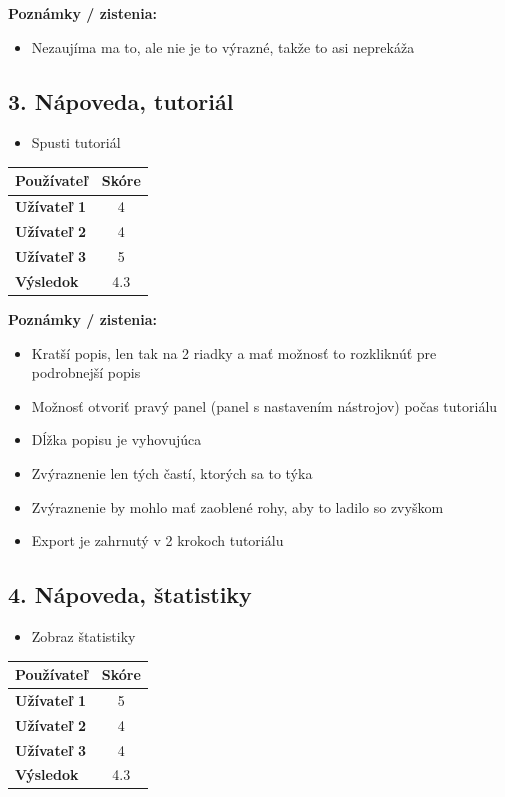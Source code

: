\documentclass[a4paper,12pt]{article}
\begin{document}
\textbf{Poznámky / zistenia:}
\begin{itemize}
    \item Nezaujíma ma to, ale nie je to výrazné, takže to asi neprekáža
\end{itemize}

\subsection*{3. Nápoveda, tutoriál}
\begin{itemize}
    \item Spusti tutoriál
\end{itemize}

\begin{longtable}{>{\bfseries}l c}
\toprule
Používateľ & Skóre \\
\midrule
Užívateľ 1 & 4 \\
Užívateľ 2 & 4 \\
Užívateľ 3 & 5 \\
Výsledok & 4.3 \\
\bottomrule
\end{longtable}

\textbf{Poznámky / zistenia:}
\begin{itemize}
    \item Kratší popis, len tak na 2 riadky a mať možnosť to rozkliknúť pre podrobnejší popis
    \item Možnosť otvoriť pravý panel (panel s nastavením nástrojov) počas tutoriálu
    \item Dĺžka popisu je vyhovujúca
    \item Zvýraznenie len tých častí, ktorých sa to týka
    \item Zvýraznenie by mohlo mať zaoblené rohy, aby to ladilo so zvyškom
    \item Export je zahrnutý v 2 krokoch tutoriálu
\end{itemize}

\newpage
\subsection*{4. Nápoveda, štatistiky}
\begin{itemize}
    \item Zobraz štatistiky
\end{itemize}

\begin{longtable}{>{\bfseries}l c}
\toprule
Používateľ & Skóre \\
\midrule
Užívateľ 1 & 5 \\
Užívateľ 2 & 4 \\
Užívateľ 3 & 4 \\
Výsledok & 4.3 \\
\bottomrule
\end{longtable}
\end{document}
